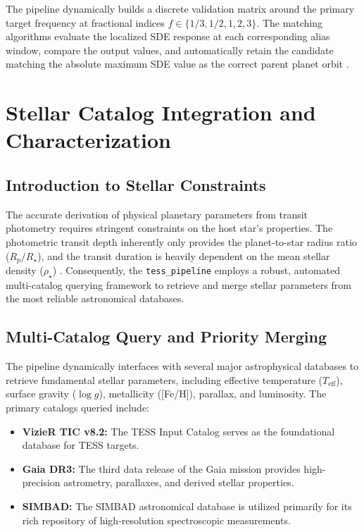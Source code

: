 \documentclass[12pt,a4paper,oneside]{report}
\newcommand{\Teff}{\ensuremath{T_{\mathrm{eff}}}}
\newcommand{\code}[1]{\texttt{\small #1}}
\begin{document}
The pipeline dynamically builds a discrete validation matrix around the primary target frequency at fractional indices \(f \in \{1/3, 1/2, 1, 2, 3\}\). The matching algorithms evaluate the localized SDE response at each corresponding alias window, compare the output values, and automatically retain the candidate matching the absolute maximum SDE value as the correct parent planet orbit \cite{tess_exoplanet_pipeline.zip:pbs_query/run_bayesian_test.out}.


\chapter{Stellar Catalog Integration and Characterization}

\section{Introduction to Stellar Constraints}
The accurate derivation of physical planetary parameters from transit photometry requires stringent constraints on the host star's properties. The photometric transit depth inherently only provides the planet-to-star radius ratio (\(R_p/R_\star\)), and the transit duration is heavily dependent on the mean stellar density (\(\rho_\star\)) \cite{seager2003}. Consequently, the \code{tess\_pipeline} employs a robust, automated multi-catalog querying framework to retrieve and merge stellar parameters from the most reliable astronomical databases.

\section{Multi-Catalog Query and Priority Merging}
The pipeline dynamically interfaces with several major astrophysical databases to retrieve fundamental stellar parameters, including effective temperature (\Teff), surface gravity (\(\log g\)), metallicity ([Fe/H]), parallax, and luminosity. The primary catalogs queried include:
\begin{itemize}
    \item \textbf{VizieR TIC v8.2:} The TESS Input Catalog \cite{stassun2019} serves as the foundational database for TESS targets.
    \item \textbf{Gaia DR3:} The third data release of the Gaia mission \cite{gaia2022} provides high-precision astrometry, parallaxes, and derived stellar properties.
    \item \textbf{SIMBAD:} The SIMBAD astronomical database \cite{wenger2000} is utilized primarily for its rich repository of high-resolution spectroscopic measurements.
\end{itemize}
\end{document}
